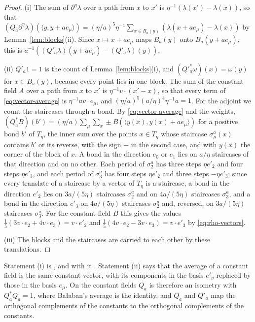 \documentclass[11pt]{preprint}
\numberwithin{equation}{section}
\theoremstyle{definition}
\theoremstyle{remark}
\theoremstyle{plain}
\begin{document}
\begin{proof}
(i) The sum of $\partial^\eta\lambda$ over a path from $x$ to $x'$ is $\eta^{-1}(\lambda(x') - \lambda(x))$, so that $(Q_a\partial^\eta\lambda)(\langle y, y + ae_\mu\rangle) = (\eta/a)^5\eta^{-1}\sum_{x \in B_a(y)}(\lambda(x + ae_\mu) - \lambda(x))$ by Lemma~\ref{lem:blocks}(ii). Since $x \mapsto x + ae_\mu$ maps $B_a(y)$ onto $B_a(y + ae_\mu)$, this is $a^{-1}((Q'_a\lambda)(y + ae_\mu) - (Q'_a\lambda)(y))$.

(ii) $Q'_a1 = 1$ is the count of Lemma~\ref{lem:blocks}(i), and $(Q'^*_a\omega)(x) = \omega(y)$ for $x \in B_a(y)$, because every point lies in one block. The sum of the constant field $A$ over a path from $x$ to $x'$ is $\eta^{-1}v \cdot (x' - x)$, so that every term of \eqref{eq:vector-average} is $\eta^{-1}av \cdot e_\mu$, and $(\eta/a)^5(a/\eta)^4\eta^{-1}a = 1$. For the adjoint we count the staircases through a bond. By \eqref{eq:vector-average} and the weights, $(Q_a^*B)(b') = (\eta/a)\sum_\mu\sum_{x}\pm B(\langle y(x), y(x) + ae_\mu\rangle)$ for a positive bond $b'$ of $T_\eta$, the inner sum over the points $x \in T_\eta$ whose staircase $\sigma^a_\mu(x)$ contains $b'$ or its reverse, with the sign $-$ in the second case, and with $y(x)$ the corner of the block of $x$. A bond in the direction $e_0$ or $e_1$ lies on $a/\eta$ staircases of that direction and on no other. Each period of $\sigma^a_2$ has three steps $\eta e'_2$ and four steps $\eta e'_3$, and each period of $\sigma^a_3$ has four steps $\eta e'_2$ and three steps $-\eta e'_3$; since every translate of a staircase by a vector of $T_\eta$ is a staircase, a bond in the direction $e'_2$ lies on $3a/(5\eta)$ staircases $\sigma^a_2$ and on $4a/(5\eta)$ staircases $\sigma^a_3$, and a bond in the direction $e'_3$ on $4a/(5\eta)$ staircases $\sigma^a_2$ and, reversed, on $3a/(5\eta)$ staircases $\sigma^a_3$. For the constant field $B$ this gives the values $\frac15(3v \cdot e_2 + 4v \cdot e_3) = v \cdot e'_2$ and $\frac15(4v \cdot e_2 - 3v \cdot e_3) = v \cdot e'_3$ by \eqref{eq:rho-vectors}.

(iii) The blocks and the staircases are carried to each other by these translations.
\end{proof}

Statement (i) is \cite[(1.55), p.~27]{BalabanPRT1}, and with it \cite[(1.9), (1.13), (1.20)]{BalabanPRT1}. Statement (ii) says that the average of a constant field is the same constant vector, with its components in the basis $e'_\nu$ replaced by those in the basis $e_\mu$. On the constant fields $Q_a$ is therefore an isometry with $Q_a^*Q_a = 1$, where Ba{\l}aban's average is the identity, and $Q_a$ and $Q'_a$ map the orthogonal complements of the constants to the orthogonal complements of the constants.
\end{document}
